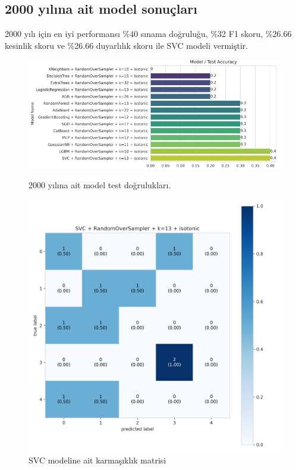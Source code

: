 \newpage

\subsection{2000 yılına ait model sonuçları}
2000 yılı için en iyi performansı \%40 sınama doğruluğu,  \%32 F1 skoru, \%26.66 kesinlik skoru ve \%26.66 duyarlılık skoru ile SVC modeli vermiştir.

\begin{figure}[ht]
\centering
\begin{minipage}[b]{0.6\textwidth}
    \centering
    \includegraphics[width=\textwidth]{2000.png}
    \caption{2000 yılına ait model test doğrulukları.}
    \label{fig:resim1}
\end{minipage}
\hfill
\begin{minipage}[b]{0.6\textwidth}
    \centering
    \includegraphics[width=\textwidth]{2000_cm.png}
    \caption{SVC modeline ait karmaşıklık matrisi}
    \label{fig:resim2}
\end{minipage}
\end{figure}

